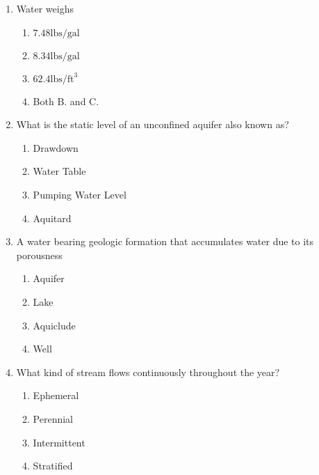 \documentclass{article}
\begin{document}
\begin{enumerate}
\item  Water weighs\\
\begin{enumerate}
\item $7.48 \mathrm{lbs} / \mathrm{gal}$\\
\item $8.34 \mathrm{lbs} / \mathrm{gal}$\\
\item $62.4 \mathrm{lbs} / \mathrm{ft}^{3}$\\
\item Both B. and C.
\end{enumerate}

\item  What is the static level of an unconfined aquifer also known as?\\
\begin{enumerate}
\item Drawdown\\
\item Water Table\\
\item Pumping Water Level\\
\item Aquitard
\end{enumerate}

\item A water bearing geologic formation that accumulates water due to its porousness\\
\begin{enumerate}
\item Aquifer\\
\item Lake\\
\item Aquiclude\\
\item Well
\end{enumerate}

\item  What kind of stream flows continuously throughout the year?\\
\begin{enumerate}
\item Ephemeral\\
\item Perennial\\
\item Intermittent\\
\item Stratified
\end{enumerate}


\end{enumerate}
\end{document}
